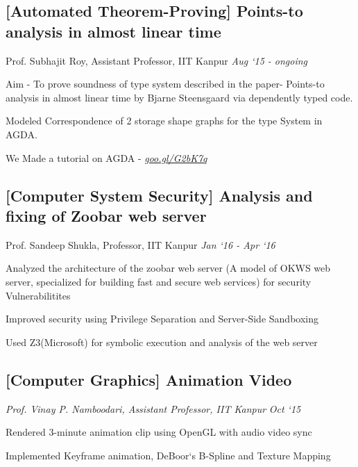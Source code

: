 \documentclass[letterpaper]{twentysecondcv} %
\begin{document}
\subsection{\textbf{[Automated Theorem-Proving] Points-to analysis in almost linear time}}
\vspace{-2mm}
Prof. Subhajit Roy, Assistant Professor, IIT Kanpur    \hfill \emph{Aug `15 -  ongoing} 
\begin{list3}
\item Aim - To prove soundness of type system described in the paper- Points-to \\ analysis in almost linear time by Bjarne Steensgaard via dependently typed code.
\item Modeled Correspondence of 2 storage shape graphs for the type System in AGDA.
\item We Made a tutorial on AGDA - \textsl{\href{https://goo.gl/G2bK7q}{goo.gl/G2bK7q}} \\
  \newline
  \newline
\end{list3}
\vspace{-3mm}
\subsection{\textbf{[Computer System Security] Analysis and fixing of Zoobar web server}}
\vspace{-2mm}
Prof. Sandeep Shukla, Professor, IIT Kanpur    \hfill \emph{Jan `16 -  Apr `16} 
\begin{list3}
\item Analyzed the architecture of the zoobar web server (A model of OKWS web server, specialized for building fast and secure web services) for security Vulnerabilitites
\item Improved security using Privilege Separation and Server-Side Sandboxing  
\item Used Z3(Microsoft) for symbolic execution and analysis of the web server  \\
  \newline
  \newline
\end{list3}
\vspace{-3mm}
\subsection{\textbf{[Computer Graphics]  Animation Video}}
\vspace{-2mm}
\textsl{Prof. Vinay P. Namboodari, Assistant Professor, IIT Kanpur   } \hfill \emph{Oct `15}
\begin{list3}
\item Rendered 3-minute animation clip using OpenGL with audio video sync
\item Implemented Keyframe animation, DeBoor`s B-Spline and Texture Mapping  \\
  \newline
  \newline
\end{list3}
\vspace{-2mm}
\end{document}
